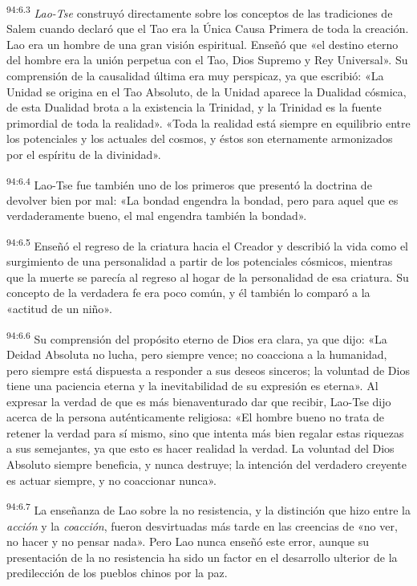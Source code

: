 \par
\textsuperscript{94:6.3} \textit{Lao-Tse} construyó directamente sobre los conceptos de las tradiciones de Salem cuando declaró que el Tao era la Única Causa Primera de toda la creación. Lao era un hombre de una gran visión espiritual. Enseñó que «el destino eterno del hombre era la unión perpetua con el Tao, Dios Supremo y Rey Universal». Su comprensión de la causalidad última era muy perspicaz, ya que escribió: «La Unidad se origina en el Tao Absoluto, de la Unidad aparece la Dualidad cósmica, de esta Dualidad brota a la existencia la Trinidad, y la Trinidad es la fuente primordial de toda la realidad». «Toda la realidad está siempre en equilibrio entre los potenciales y los actuales del cosmos, y éstos son eternamente armonizados por el espíritu de la divinidad».

\par
\textsuperscript{94:6.4} Lao-Tse fue también uno de los primeros que presentó la doctrina de devolver bien por mal: «La bondad engendra la bondad, pero para aquel que es verdaderamente bueno, el mal engendra también la bondad».

\par
\textsuperscript{94:6.5} Enseñó el regreso de la criatura hacia el Creador y describió la vida como el surgimiento de una personalidad a partir de los potenciales cósmicos, mientras que la muerte se parecía al regreso al hogar de la personalidad de esa criatura. Su concepto de la verdadera fe era poco común, y él también lo comparó a la «actitud de un niño».

\par
\textsuperscript{94:6.6} Su comprensión del propósito eterno de Dios era clara, ya que dijo: «La Deidad Absoluta no lucha, pero siempre vence; no coacciona a la humanidad, pero siempre está dispuesta a responder a sus deseos sinceros; la voluntad de Dios tiene una paciencia eterna y la inevitabilidad de su expresión es eterna». Al expresar la verdad de que es más bienaventurado dar que recibir, Lao-Tse dijo acerca de la persona auténticamente religiosa: «El hombre bueno no trata de retener la verdad para sí mismo, sino que intenta más bien regalar estas riquezas a sus semejantes, ya que esto es hacer realidad la verdad. La voluntad del Dios Absoluto siempre beneficia, y nunca destruye; la intención del verdadero creyente es actuar siempre, y no coaccionar nunca».

\par
\textsuperscript{94:6.7} La enseñanza de Lao sobre la no resistencia, y la distinción que hizo entre la \textit{acción} y la \textit{coacción}, fueron desvirtuadas más tarde en las creencias de «no ver, no hacer y no pensar nada». Pero Lao nunca enseñó este error, aunque su presentación de la no resistencia ha sido un factor en el desarrollo ulterior de la predilección de los pueblos chinos por la paz.

